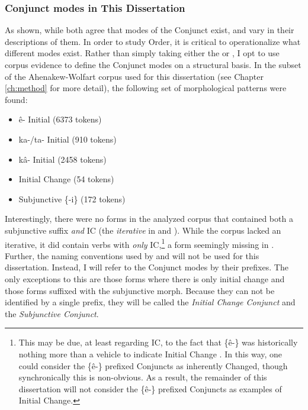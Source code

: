  
 \subsubsection{Conjunct modes in This Dissertation}
As shown, while both agree that modes of the Conjunct exist, \citet{Wolfart1973} and \citet{Cook2014} vary in their descriptions of them. In order to study Order, it is critical to operationalize what different modes exist. Rather than simply taking either the \citet{Wolfart1973} or \citet{Cook2014}, I opt to use corpus evidence to define the Conjunct modes on a structural basis.  In the subset of the Ahenakew-Wolfart corpus \citep{arppe1945morphosyntactically} used for this dissertation (see Chapter \ref{ch:method} for more detail), the following set of morphological patterns were found:

\begin{itemize}
    \item ê- Initial (6373 tokens)
    \item ka-/ta- Initial (910 tokens)
    \item kâ- Initial (2458 tokens)
    \item Initial Change (54 tokens)
    \item Subjunctive \{-i\} (172 tokens)
\end{itemize}

Interestingly, there were no forms in the analyzed corpus that contained both a subjunctive suffix \textit{and} IC (the \textit{iterative} in \citet{Wolfart1973} and \citet{Cook2014}). While the corpus lacked an iterative, it did contain verbs with \textit{only} IC,\footnote{This may be due, at least regarding IC, to the fact that \{ê-\} was historically nothing more than a vehicle to indicate Initial Change \citep[46]{Wolfart1973}. In this way, one could consider the \{ê-\} prefixed Conjuncts as inherently Changed, though synchronically this is non-obvious. As a result, the remainder of this dissertation will not consider the \{ê-\} prefixed Conjuncts as examples of Initial Change.} a form seemingly missing in \citet{Cook2014}. Further, the naming conventions used by \citet{Cook2014} and \citet{Wolfart1973} will not be used for this dissertation. Instead, I will refer to the Conjunct modes by their prefixes. The only exceptions to this are those forms where there is only initial change and those forms suffixed with the subjunctive morph. Because they can not be identified by a single prefix, they will be called the \textit{Initial Change Conjunct} and the \textit{Subjunctive Conjunct}.

